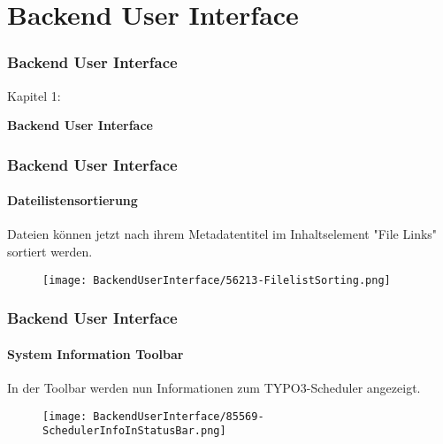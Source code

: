 %

\section{Backend User Interface}
\begin{frame}[fragile]
	\frametitle{Backend User Interface}

	\begin{center}\huge{Kapitel 1:}\end{center}
	\begin{center}\huge{\color{typo3darkgrey}\textbf{Backend User Interface}}\end{center}

\end{frame}


\begin{frame}[fragile]
	\frametitle{Backend User Interface}
	\framesubtitle{Dateilistensortierung}

	Dateien können jetzt nach ihrem Metadatentitel im Inhaltselement "File Links" sortiert werden.

	\begin{figure}
		\texttt{[image: BackendUserInterface/56213-FilelistSorting.png]}
	\end{figure}

\end{frame}


\begin{frame}[fragile]
	\frametitle{Backend User Interface}
	\framesubtitle{System Information Toolbar}

	In der Toolbar werden nun Informationen zum TYPO3-Scheduler angezeigt.

	\begin{figure}
		\texttt{[image: BackendUserInterface/85569-SchedulerInfoInStatusBar.png]}
	\end{figure}

\end{frame}

